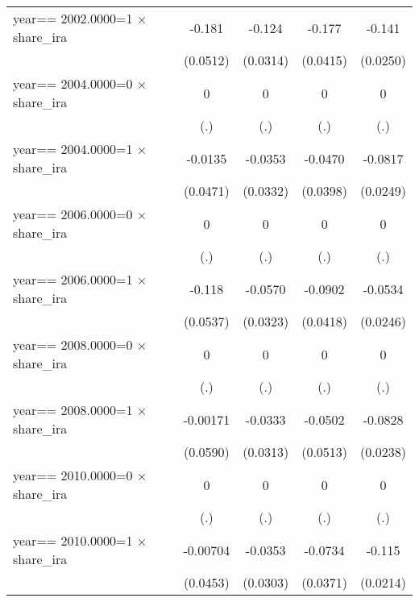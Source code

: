 \begin{table}[htbp]
\begin{tabular}{l*{4}{c}}
year==  2002.0000=1 $\times$ share\_ira&   -0.181\sym{***}&   -0.124\sym{***}&   -0.177\sym{***}&   -0.141\sym{***}\\
                & (0.0512)         & (0.0314)         & (0.0415)         & (0.0250)         \\
year==  2004.0000=0 $\times$ share\_ira&        0         &        0         &        0         &        0         \\
                &      (.)         &      (.)         &      (.)         &      (.)         \\
year==  2004.0000=1 $\times$ share\_ira&  -0.0135         &  -0.0353         &  -0.0470         &  -0.0817\sym{***}\\
                & (0.0471)         & (0.0332)         & (0.0398)         & (0.0249)         \\
year==  2006.0000=0 $\times$ share\_ira&        0         &        0         &        0         &        0         \\
                &      (.)         &      (.)         &      (.)         &      (.)         \\
year==  2006.0000=1 $\times$ share\_ira&   -0.118\sym{**} &  -0.0570\sym{*}  &  -0.0902\sym{**} &  -0.0534\sym{**} \\
                & (0.0537)         & (0.0323)         & (0.0418)         & (0.0246)         \\
year==  2008.0000=0 $\times$ share\_ira&        0         &        0         &        0         &        0         \\
                &      (.)         &      (.)         &      (.)         &      (.)         \\
year==  2008.0000=1 $\times$ share\_ira& -0.00171         &  -0.0333         &  -0.0502         &  -0.0828\sym{***}\\
                & (0.0590)         & (0.0313)         & (0.0513)         & (0.0238)         \\
year==  2010.0000=0 $\times$ share\_ira&        0         &        0         &        0         &        0         \\
                &      (.)         &      (.)         &      (.)         &      (.)         \\
year==  2010.0000=1 $\times$ share\_ira& -0.00704         &  -0.0353         &  -0.0734\sym{**} &   -0.115\sym{***}\\
                & (0.0453)         & (0.0303)         & (0.0371)         & (0.0214)         \\

\end{tabular}
\end{table}
